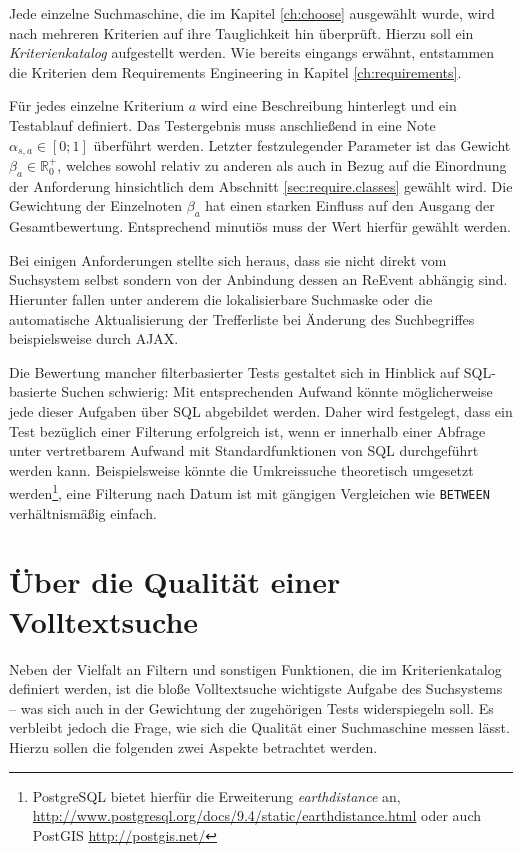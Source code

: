 Jede einzelne Suchmaschine, die im Kapitel \ref{ch:choose} ausgewählt wurde, wird nach mehreren Kriterien auf ihre Tauglichkeit hin überprüft. Hierzu soll ein \emph{Kriterienkatalog} aufgestellt werden. Wie bereits eingangs erwähnt, entstammen die Kriterien dem Requirements Engineering in Kapitel \ref{ch:requirements}.

Für jedes einzelne Kriterium $a$ wird eine Beschreibung hinterlegt und ein Testablauf definiert. Das Testergebnis muss anschließend in eine Note $\alpha_{s,a} \in [0;1]$ überführt werden. Letzter festzulegender Parameter ist das Gewicht $\beta_{a} \in \mathbb{R}_0^+$, welches sowohl relativ zu anderen als auch in Bezug auf die Einordnung der Anforderung hinsichtlich dem Abschnitt \ref{sec:require.classes} gewählt wird. Die Gewichtung der Einzelnoten $\beta_{a}$ hat einen starken Einfluss auf den Ausgang der Gesamtbewertung. Entsprechend minutiös muss der Wert hierfür gewählt werden.

Bei einigen Anforderungen stellte sich heraus, dass sie nicht direkt vom Suchsystem selbst sondern von der Anbindung dessen an ReEvent abhängig sind. Hierunter fallen unter anderem die lokalisierbare Suchmaske oder die automatische Aktualisierung der Trefferliste bei Änderung des Suchbegriffes beispielsweise durch AJAX.

Die Bewertung mancher filterbasierter Tests gestaltet sich in Hinblick auf SQL-basierte Suchen schwierig: Mit entsprechenden Aufwand könnte möglicherweise jede dieser Aufgaben über SQL abgebildet werden. Daher wird festgelegt, dass ein Test bezüglich einer Filterung erfolgreich ist, wenn er innerhalb einer Abfrage unter vertretbarem Aufwand mit Standardfunktionen von SQL durchgeführt werden kann. Beispielsweise könnte die Umkreissuche theoretisch umgesetzt werden\footnote{PostgreSQL bietet hierfür die Erweiterung \emph{earthdistance} an, \url{http://www.postgresql.org/docs/9.4/static/earthdistance.html} oder auch PostGIS \url{http://postgis.net/}}, eine Filterung nach Datum ist mit gängigen Vergleichen wie \texttt{BETWEEN} verhältnismäßig einfach.



\section{Über die Qualität einer Volltextsuche}
Neben der Vielfalt an Filtern und sonstigen Funktionen, die im Kriterienkatalog definiert werden, ist die bloße Volltextsuche wichtigste Aufgabe des Suchsystems -- was sich auch in der Gewichtung der zugehörigen Tests widerspiegeln soll. Es verbleibt jedoch die Frage, wie sich die Qualität einer Suchmaschine messen lässt. Hierzu sollen die folgenden zwei Aspekte betrachtet werden.

